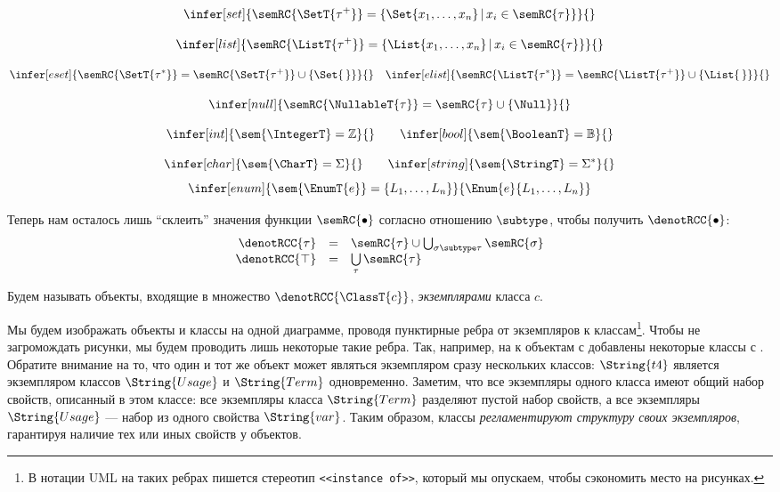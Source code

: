 $$
\infer[set]{
	\semRC{\SetT{\tau^+}} = \left\{ \Set{x_1,\ldots,x_n} \,|\, x_i \in \semRC{\tau}\right\}
}{
}
$$ 

$$
\infer[list]{
	\semRC{\ListT{\tau^+}} = \left\{ \List{x_1,\ldots,x_n} \,|\, x_i \in \semRC{\tau}\right\}
}{
}
$$ 

$$
\infer[eset]{
	\semRC{\SetT{\tau^*}} = \semRC{\SetT{\tau^+}} \cup \left\{ \Set{\,} \right\}
}{
}	
\quad
\infer[elist]{
	\semRC{\ListT{\tau^*}} = \semRC{\ListT{\tau^+}} \cup \left\{ \List{\,} \right\}
}{
}	
$$ 

$$
\infer[null]{
	\semRC{\NullableT{\tau}} = \semRC{\tau} \cup \{\Null\}
}{
}
$$

$$
\infer[int]{
	\sem{\IntegerT} = \mathbb{Z}
}{
}\qquad
\infer[bool]{
	\sem{\BooleanT} = \mathbb{B}
}{
}
$$

$$
\infer[char]{
	\sem{\CharT} = \Sigma
}{
}\qquad
\infer[string]{
	\sem{\StringT} = \Sigma^*
}{
}
$$ $$
\infer[enum]{
	\sem{\EnumT{e}} = \{L_1, \ldots, L_n\}
}{
	\Enum{e}{L_1, \ldots, L_n}
}
$$

Теперь нам осталось лишь ``склеить'' значения функции $\semRC{\bullet}$ согласно отношению $\subtype$, чтобы получить $\denotRCC{\bullet}$:
$$
\begin{array}{rcl}
	\denotRCC{\tau} &=& \semRC{\tau} \cup \bigcup_{\sigma \subtype \tau} \semRC{\sigma}\\
	\denotRCC{\top} &=& \bigcup\limits_\tau \semRC{\tau}\\
\end{array}	
$$

\begin{Def}
Будем называть объекты, входящие в множество $\denotRCC{\ClassT{c}}$, \emph{экземплярами} класса $c$.
\end{Def}

Мы будем изображать объекты и классы на одной диаграмме, проводя пунктирные ребра от экземпляров к классам\footnote{В нотации UML на таких ребрах пишется стереотип \texttt{\scriptsize<<instance of>>}, который мы опускаем, чтобы сэкономить место на рисунках.}. Чтобы не загромождать рисунки, мы будем проводить лишь некоторые такие ребра. Так, например, на  к объектам с  добавлены некоторые классы с .
%
%
%
Обратите внимание на то, что один и тот же объект может являться экземпляром сразу нескольких классов: $\String{t4}$ является экземпляром классов $\String{Usage}$ и $\String{Term}$ одновременно. Заметим, что все экземпляры одного класса имеют общий набор свойств, описанный в этом классе: все экземпляры класса $\String{Term}$ разделяют пустой набор свойств, а все экземпляры $\String{Usage}$ --- набор из одного свойства $\String{var}$. Таким образом, классы \emph{регламентируют структуру своих экземпляров}, гарантируя наличие тех или иных свойств у объектов.

